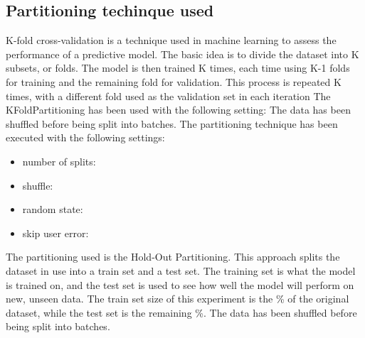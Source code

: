 \documentclass[11pt]{article}
\begin{document}
\subsection{Partitioning techinque used}\label{subsec:partitioning}
K-fold cross-validation is a technique used in machine learning to assess
the performance of a predictive model. The basic idea is to divide the dataset
into K subsets, or folds. The model is then trained K times, each time using K-1
folds for training and the remaining fold for validation. This process is
repeated K times, with a different fold used as the validation set in each iteration
\hfill\break
\hfill\break
The KFoldPartitioning has been used with the following setting:
\hfill\break
\hfill\break
{}
The data has been shuffled before being split into batches.
The partitioning technique has been executed with the following settings:
\begin{itemize}
    \item number of splits: 
    \item shuffle: 
    \item random state: 
    \item skip user error: 
\end{itemize}
\hfill\break
\hfill\break


The partitioning used is the Hold-Out Partitioning.
This approach splits the dataset in use into a train set and a test set.
The training set is what the model is trained on, and the test set is used to see how
well the model will perform on new, unseen data.
\hfill\break
\hfill\break
The train set size of this experiment is the \%
of the original dataset, while the test set is the remaining \%.
\hfill\break
\hfill\break
{}
The data has been shuffled before being split into batches.
\hfill\break
\hfill\break
\end{document}
